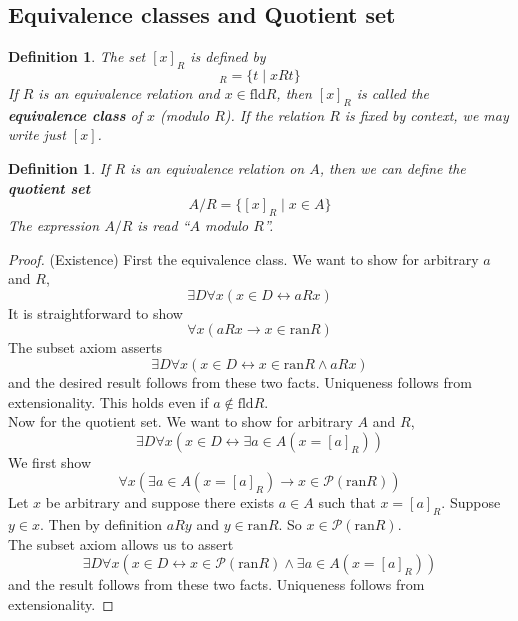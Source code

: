 \documentclass{report}
\newtheorem{definition}[theo]{Definition}
\begin{document}
\subsection{Equivalence classes and Quotient set}
\begin{definition}
The set $[x]_R$ is defined by
\begin{equation*}
[x]_R=\{t\mid xRt\}
\end{equation*}
If $R$ is an equivalence relation and $x\in\text{fld}R$, then $[x]_R$ is called the \textbf{equivalence class} of $x$ (modulo $R$). If the relation $R$ is fixed
by context, we may write just $[x]$.
\end{definition}
\begin{definition}
If $R$ is an equivalence relation on $A$, then we can define the \textbf{quotient set}
\begin{equation*}
A/R=\{[x]_R\mid x\in A\}
\end{equation*}
The expression $A/R$ is read ``$A$ modulo $R$''.
\end{definition}
\begin{proof}(Existence)
First the equivalence class. We want to show for arbitrary $a$ and $R$,
\begin{equation*}
\exists D\forall x(x\in D\leftrightarrow aRx)
\end{equation*}
It is straightforward to show
\begin{equation*}
\forall x(aRx\to x\in\text{ran}R)
\end{equation*}
The subset axiom asserts
\begin{equation*}
\exists D\forall x(x\in D\leftrightarrow  x\in\text{ran}R\land aRx)
\end{equation*}
and the desired result follows from these two facts. Uniqueness follows from extensionality. This holds even if $a\notin\text{fld}R$.\\
\indent Now for the quotient set. We want to show for arbitrary $A$ and $R$,
\begin{equation*}
\exists D\forall x(x\in D\leftrightarrow\exists a\in A(x=[a]_R))
\end{equation*}
We first show
\begin{equation*}
\forall x(\exists a\in A(x=[a]_R)\to x\in\mathscr P(\text{ran}R))
\end{equation*}
Let $x$ be arbitrary and suppose there exists $a\in A$ such that $x=[a]_R$.
Suppose $y\in x$. Then by definition $aRy$ and $y\in\text{ran}R$. So $x\in\mathscr P(\text{ran}R)$.\\ 
\indent The subset axiom allows us to assert
\begin{equation*}
\exists D\forall x(x\in D\leftrightarrow x\in\mathscr P(\text{ran}R)\land\exists a\in A(x=[a]_R))
\end{equation*}
and the result follows from these two facts. Uniqueness follows from extensionality.
\end{proof}
\end{document}
